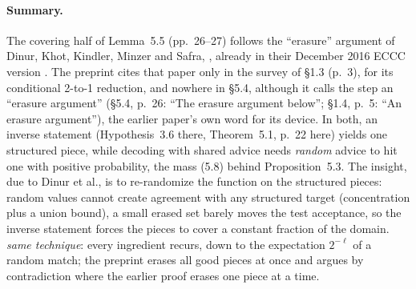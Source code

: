 \documentclass[11pt]{article}
\newcommand{\ploc}[2]{#1}
\newcommand{\sloc}[2]{\cite[#2]{#1}}
\newcommand{\rel}[1]{\textit{#1}}
\begin{document}
\paragraph{Summary.}
The covering half of \ploc{Lemma~5.5 (pp.~26--27)}{04-matrix.tex:325--415} follows the ``erasure'' argument of Dinur, Khot, Kindler, Minzer and Safra, \sloc{DinurEtAl2018-Towards2to1}{Lemma~3.7 with Claims~3.8--3.9, pp.~23--24}, already in their December 2016 ECCC version \sloc{DinurEtAl2016-Towards2to1-ECCC}{Lemma~3.7, pp.~14--16}. The preprint cites that paper only in the survey of \ploc{\S1.3 (p.~3)}{00-introduction.tex:119--122}, for its conditional 2-to-1 reduction, and nowhere in \ploc{\S5.4}{04-matrix.tex:299--443}, although it calls the step an ``erasure argument'' (\ploc{\S5.4, p.~26}{04-matrix.tex:305}: ``The erasure argument below''; \ploc{\S1.4, p.~5}{00-introduction.tex:248--249}: ``An erasure argument''), the earlier paper's own word for its device. In both, an inverse statement (Hypothesis~3.6 there, \ploc{Theorem~5.1, p.~22}{04-matrix.tex:33--54} here) yields one structured piece, while decoding with shared advice needs \emph{random} advice to hit one with positive probability, the mass \ploc{(5.8)}{04-matrix.tex:329--335} behind \ploc{Proposition~5.3}{04-matrix.tex:197}. The insight, due to Dinur et al., is to re-randomize the function on the structured pieces: random values cannot create agreement with any structured target (concentration plus a union bound), a small erased set barely moves the test acceptance, so the inverse statement forces the pieces to cover a constant fraction of the domain. \rel{same technique}: every ingredient recurs, down to the expectation $2^{-\ell}$ of a random match; the preprint erases all good pieces at once and argues by contradiction where the earlier proof erases one piece at a time.
\end{document}
